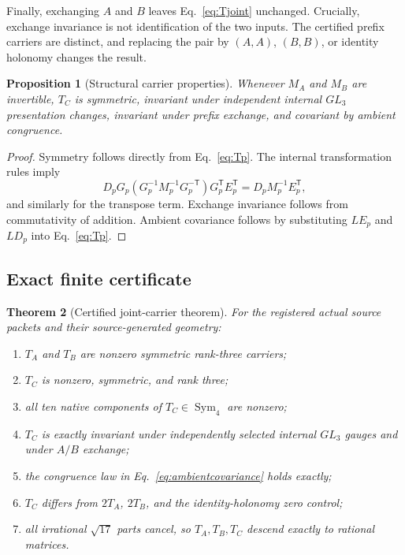 \documentclass[11pt]{article}
\newtheorem{theorem}{Theorem}[section]
\newtheorem{proposition}[theorem]{Proposition}
\theoremstyle{definition}
\theoremstyle{remark}
\newcommand{\Sym}{\operatorname{Sym}}
\begin{document}
Finally, exchanging $A$ and $B$ leaves Eq.~\eqref{eq:Tjoint} unchanged. Crucially, exchange invariance is not identification of the two inputs. The certified prefix carriers are distinct, and replacing the pair by $(A,A)$, $(B,B)$, or identity holonomy changes the result.

\begin{proposition}[Structural carrier properties]\label{prop:structural}
Whenever $M_A$ and $M_B$ are invertible, $T_C$ is symmetric, invariant under independent internal $GL_3$ presentation changes, invariant under prefix exchange, and covariant by ambient congruence.
\end{proposition}

\begin{proof}
Symmetry follows directly from Eq.~\eqref{eq:Tp}. The internal transformation rules imply
\[
 D_pG_p(G_p^{-1}M_p^{-1}G_p^{-\mathsf T})G_p^{\mathsf T}E_p^{\mathsf T}
 =D_pM_p^{-1}E_p^{\mathsf T},
\]
and similarly for the transpose term. Exchange invariance follows from commutativity of addition. Ambient covariance follows by substituting $LE_p$ and $LD_p$ into Eq.~\eqref{eq:Tp}.
\end{proof}

\subsection{Exact finite certificate}

\begin{theorem}[Certified joint-carrier theorem]\label{thm:x60}
For the registered actual source packets and their source-generated geometry:
\begin{enumerate}
\item $T_A$ and $T_B$ are nonzero symmetric rank-three carriers;
\item $T_C$ is nonzero, symmetric, and rank three;
\item all ten native components of $T_C\in\Sym_4$ are nonzero;
\item $T_C$ is exactly invariant under independently selected internal $GL_3$ gauges and under $A/B$ exchange;
\item the congruence law in Eq.~\eqref{eq:ambientcovariance} holds exactly;
\item $T_C$ differs from $2T_A$, $2T_B$, and the identity-holonomy zero control;
\item all irrational $\sqrt{17}$ parts cancel, so $T_A,T_B,T_C$ descend exactly to rational matrices.
\end{enumerate}
\end{theorem}
\end{document}
